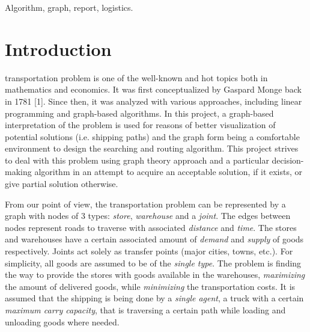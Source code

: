 \documentclass[journal,onecolumn]{IEEEtran}
\begin{document}
\begin{IEEEkeywords}
Algorithm, graph, report, logistics.
\end{IEEEkeywords}

%
\IEEEpeerreviewmaketitle



\section{Introduction}
 transportation problem is one of the well-known and hot topics both in mathematics and economics.
It was first conceptualized by Gaspard Monge back in 1781 [1]. Since then, it was analyzed with various approaches, including linear programming and graph-based algorithms. In this project, a graph-based interpretation of the problem is used for reasons of better visualization of potential solutions (i.e. shipping paths) and the graph form being a comfortable environment to design the searching and routing algorithm. This project strives to deal with this problem using graph theory approach and a particular decision-making algorithm in an attempt to acquire an acceptable solution, if it exists, or give partial solution otherwise.

From our point of view, the transportation problem can be represented by a graph with nodes of 3 types: \textit{store}, \textit{warehouse} and a \textit{joint}. The edges between nodes represent roads to traverse with associated \textit{distance} and \textit{time}. The stores and warehouses have a certain associated amount of \textit{demand} and \textit{supply} of goods respectively. Joints act solely as transfer points (major cities, towns, etc.). For simplicity, all goods are assumed to be of the \textit{single type}. The problem is finding the way to provide the stores with goods available in the warehouses, \textit{maximizing} the amount of delivered goods, while \textit{minimizing} the transportation costs. It is assumed that the shipping is being done by a \textit{single agent}, a truck with a certain \textit{maximum carry capacity}, that is traversing a certain path while loading and unloading goods where needed.
\end{document}
